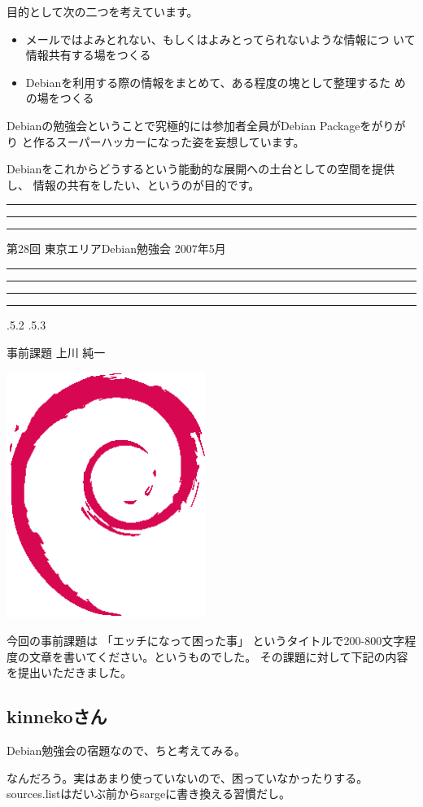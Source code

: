 \documentclass[mingoth,a4paper]{jsarticle}
\makeatletter
\newcommand{\debmtgyear}{2007}
\newcommand{\debmtgmonth}{5}
\newcommand{\debmtgnumber}{28}
\renewcommand{\section}{\@startsection{section}{1}{\z@}%
    {\Cvs \@plus.5\Cdp \@minus.2\Cdp}%
    {.5\Cvs \@plus.3\Cdp}%
    {\normalfont\gt\fontsize{26}{26}\headfont\raggedright}} %
\newcommand{\dancersection}[2]{%
\newpage
第\debmtgnumber{}回 東京エリアDebian勉強会 \debmtgyear{}年\debmtgmonth{}月
\hrule
\vspace{0.5mm}
\hrule
%
\vspace{4cm}
\hrule
\vspace{0.5mm}
\hrule
%
\vspace{-7cm}
\begin{minipage}[b]{0.7\hsize}
\section{#1}
\hfill{}#2\\
\vspace{2cm}
\end{minipage}
\begin{minipage}[b]{0.3\hsize}
\hfill{}\includegraphics[height=8cm]{image200502/openlogo-nd.eps}\\
\end{minipage}
%
\vspace{-1cm}
}
\makeatother
\begin{document}
 目的として次の二つを考えています。

 \begin{itemize}
 \item メールではよみとれない、もしくはよみとってられないような情報につ
       いて情報共有する場をつくる
 \item Debianを利用する際の情報をまとめて、ある程度の塊として整理するた
       めの場をつくる
 \end{itemize}

 Debianの勉強会ということで究極的には参加者全員がDebian Packageをがりがり
 と作るスーパーハッカーになった姿を妄想しています。

 Debianをこれからどうするという能動的な展開への土台としての空間を提供し、
 情報の共有をしたい、というのが目的です。

\newpage

\begin{minipage}[b]{0.2\hsize}
 \colorbox{titleback}{}
\end{minipage}
\begin{minipage}[b]{0.8\hsize}
\hrule
\vspace{2mm}
\hrule
\tableofcontents
\vspace{2mm}
\hrule
\end{minipage}

\dancersection{事前課題}{上川 純一}

今回の事前課題は
「エッチになって困った事」
というタイトルで200-800文字程度の文章を書いてください。というものでした。
その課題に対して下記の内容を提出いただきました。

\subsection{kinnekoさん}

Debian勉強会の宿題なので、ちと考えてみる。

なんだろう。実はあまり使っていないので、困っていなかったりする。
sources.listはだいぶ前からsargeに書き換える習慣だし。
\end{document}
